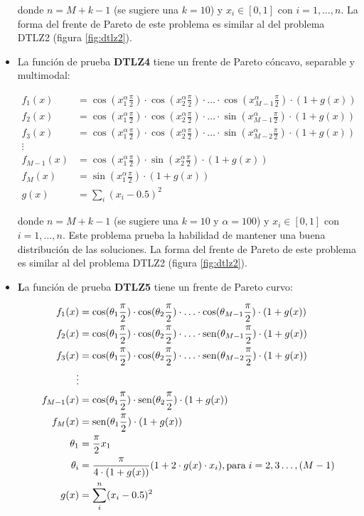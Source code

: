 \begin{itemize}
donde $n=M+k-1$ (se sugiere una $k=10$) y $x_i\in[0,1]$ con $i=1, \ldots, n$. La forma del frente de Pareto de este
problema es similar al del problema DTLZ2 (figura \ref{fig:dtlz2}).

\item La funci\'on de prueba \textbf{DTLZ4} tiene un frente de Pareto c\'oncavo, separable y multimodal:

\begin{align*}
f_1(x)&=\cos(x_1^\alpha\frac{\pi}{2})\cdot\cos(x_2^\alpha\frac{\pi}{2})\cdot\ldots\cdot \cos(x_{M-1}^\alpha\frac{\pi}{2})\cdot(1+g(x))\\
f_2(x)&=\cos(x_1^\alpha\frac{\pi}{2})\cdot\cos(x_2^\alpha\frac{\pi}{2})\cdot\ldots\cdot \sin(x_{M-1}^\alpha\frac{\pi}{2})\cdot(1+g(x))\\
f_3(x)&=\cos(x_1^\alpha\frac{\pi}{2})\cdot\cos(x_2^\alpha\frac{\pi}{2})\cdot\ldots\cdot \sin(x_{M-2}^\alpha\frac{\pi}{2})\cdot(1+g(x))\\
\vdots&\\
f_{M-1}(x)&=\cos(x_1^\alpha\frac{\pi}{2})\cdot\sin(x_2^\alpha\frac{\pi}{2})\cdot(1+g(x))\\
f_{M}(x)&=\sin(x_1^\alpha\frac{\pi}{2})\cdot(1+g(x))\\
g(x)&=\sum_i(x_i-0.5)^2
\end{align*}

donde $n=M+k-1$ (se sugiere una $k=10$ y $\alpha=100$) y $x_i\in[0,1]$ con $i=1,\ldots, n$. Este problema prueba la habilidad de mantener 
una buena distribuci\'on de las soluciones. La forma del frente de Pareto de este
problema es similar al del problema DTLZ2 (figura \ref{fig:dtlz2}).

\item \textbf La funci\'on de prueba \textbf{DTLZ5} tiene un frente de Pareto curvo:

\begin{align*}
f_1(x)&=\cos(\theta_1\frac{\pi}{2})\cdot\cos(\theta_2\frac{\pi}{2})\cdot\ldots\cdot \cos(\theta_{M-1}\frac{\pi}{2})\cdot(1+g(x))\\
f_2(x)&=\cos(\theta_1\frac{\pi}{2})\cdot\cos(\theta_2\frac{\pi}{2})\cdot\ldots\cdot \sin(\theta_{M-1}\frac{\pi}{2})\cdot(1+g(x))\\
f_3(x)&=\cos(\theta_1\frac{\pi}{2})\cdot\cos(\theta_2\frac{\pi}{2})\cdot\ldots\cdot \sin(\theta_{M-2}\frac{\pi}{2})\cdot(1+g(x))\\
\vdots&\\
f_{M-1}(x)&=\cos(\theta_1\frac{\pi}{2})\cdot\sin(\theta_2\frac{\pi}{2})\cdot(1+g(x))\\
f_{M}(x)&=\sin(\theta_1\frac{\pi}{2})\cdot(1+g(x))\\
\theta_1&=\frac{\pi}{2}x_1\\
\theta_i&=\frac{\pi}{4\cdot(1+g(x))}(1+2\cdot g(x)\cdot x_i),  \text{para} \hspace{1mm} i=2,3\dots,(M-1)\\
g(x)&=\sum^n_i(x_i-0.5)^2
\end{align*}


\end{itemize}
